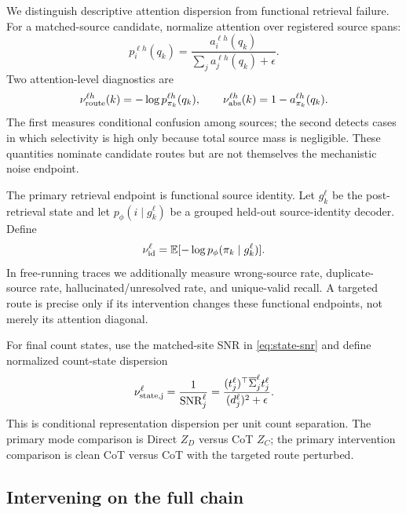 We distinguish descriptive attention dispersion from functional retrieval failure. For a matched-source candidate, normalize attention over registered source spans:
\begin{equation}
p_i^{\ell h}(q_k)=
\frac{a_i^{\ell h}(q_k)}
{\sum_j a_j^{\ell h}(q_k)+\epsilon}.
\label{eq:source-distribution}
\end{equation}
Two attention-level diagnostics are
\begin{equation}
\nu_{\rm route}^{\ell h}(k)=-\log p_{\pi_k}^{\ell h}(q_k),
\qquad
\nu_{\rm abs}^{\ell h}(k)=1-a_{\pi_k}^{\ell h}(q_k).
\label{eq:attention-noise}
\end{equation}
The first measures conditional confusion among sources; the second detects cases in which selectivity is high only because total source mass is negligible. These quantities nominate candidate routes but are not themselves the mechanistic noise endpoint.

The primary retrieval endpoint is functional source identity. Let \(g_k^\ell\) be the post-retrieval state and let \(p_\phi(i\mid g_k^\ell)\) be a grouped held-out source-identity decoder. Define
\begin{equation}
\nu_{\rm id}^{\ell}
=
\mathbb{E}[-\log p_\phi(\pi_k\mid g_k^\ell)].
\label{eq:identity-noise}
\end{equation}
In free-running traces we additionally measure wrong-source rate, duplicate-source rate, hallucinated/unresolved rate, and unique-valid recall. A targeted route is precise only if its intervention changes these functional endpoints, not merely its attention diagonal.

For final count states, use the matched-site SNR in \cref{eq:state-snr} and define normalized count-state dispersion
\begin{equation}
\nu_{\rm state,j}^{\ell}=\frac{1}{\operatorname{SNR}_j^\ell}
=
\frac{(t_j^\ell)^\top\overline\Sigma_j^\ell t_j^\ell}
{(d_j^\ell)^2+\epsilon}.
\label{eq:state-noise}
\end{equation}
This is conditional representation dispersion per unit count separation. The primary mode comparison is Direct \(Z_D\) versus CoT \(Z_C\); the primary intervention comparison is clean CoT versus CoT with the targeted route perturbed.

\subsection{Intervening on the full chain}


